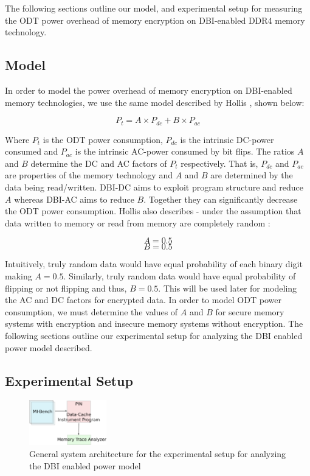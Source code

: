The following sections outline our model, and experimental setup for measuring
the ODT power overhead of memory encryption on DBI-enabled DDR4 memory
technology.

\subsection{Model}
In order to model the power overhead of memory encryption on DBI-enabled memory
technologies, we use the same model described by Hollis \cite{hollis}, shown
below:

    $$ P_t = A \times P_{dc} + B \times P_{ac}$$

Where $P_t$ is the ODT power consumption, $P_{dc}$ is the intrinsic DC-power
consumed and $P_{ac}$ is the intrinsic AC-power consumed by bit flips. The
ratios $A$ and $B$ determine the DC and AC factors of $P_t$ respectively. That
is, $P_{dc}$ and $P_{ac}$ are properties of the memory technology and $A$ and
$B$ are determined by the data being read/written.  DBI-DC aims to exploit
program structure and reduce $A$ whereas DBI-AC aims to reduce $B$. Together
they can significantly decrease the ODT power consumption.  Hollis also
describes - under the assumption that data written to memory or read from
memory are completely random \cite{hollis}:

  $$ A = 0.5$$
  $$ B = 0.5$$

Intuitively, truly random data would have equal probability of each binary
digit making $A = 0.5$. Similarly, truly random data would have equal
probability of flipping or not flipping and thus, $B = 0.5$. This will be used
later for modeling the AC and DC factors for encrypted data. In order to model
ODT power consumption, we must determine the values of $A$ and $B$ for secure
memory systems with encryption and insecure memory systems without encryption.
The following sections outline our experimental setup for analyzing the DBI
enabled power model described.

\subsection{Experimental Setup}

\begin{figure}[!htb]
  \centering
  \includegraphics[width=0.3\textwidth]{figs/exp-design}
  \caption{General system architecture for the experimental setup for analyzing
  the DBI enabled power model}
  \label{fig:exp}
\end{figure}

